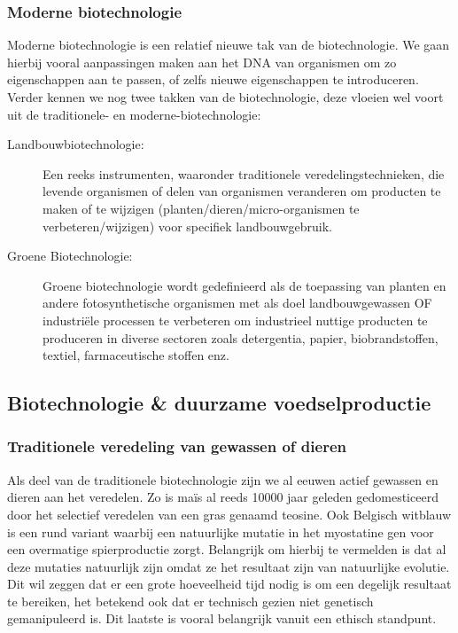 \documentclass[a4paper,kul]{kulakarticle} %
\begin{document}
\subsubsection{Moderne biotechnologie}
Moderne biotechnologie is een relatief nieuwe tak van de biotechnologie. We gaan hierbij vooral aanpassingen maken aan het DNA van organismen om zo eigenschappen aan te passen, of zelfs nieuwe eigenschappen te introduceren. 
\newpage
Verder kennen we nog twee takken van de biotechnologie, deze vloeien wel voort uit de traditionele- en moderne-biotechnologie:
\begin{description}
	\item[Landbouwbiotechnologie:] Een reeks instrumenten, waaronder traditionele veredelingstechnieken,
	die levende organismen of delen van organismen veranderen om
	producten te maken of te wijzigen (planten/dieren/micro-organismen te
	verbeteren/wijzigen) voor specifiek landbouwgebruik.
	\item[Groene Biotechnologie:] Groene biotechnologie wordt gedefinieerd als de
	toepassing van planten en andere fotosynthetische
	organismen met als doel landbouwgewassen OF
	industriële processen te verbeteren om industrieel nuttige producten te
	produceren in diverse sectoren zoals detergentia, papier,
	biobrandstoffen, textiel, farmaceutische stoffen enz.
\end{description}
\subsection{Biotechnologie \& duurzame voedselproductie}
\subsubsection{Traditionele veredeling van gewassen of dieren}
Als deel van de traditionele biotechnologie zijn we al eeuwen actief gewassen en dieren aan het veredelen. Zo is maïs al reeds \num{10000} jaar geleden gedomesticeerd door het selectief veredelen van een gras genaamd teosine. Ook Belgisch witblauw is een rund variant waarbij een natuurlijke mutatie in het myostatine gen voor een overmatige spierproductie zorgt. Belangrijk om hierbij te vermelden is dat al deze mutaties natuurlijk zijn omdat ze het resultaat zijn van natuurlijke evolutie. Dit wil zeggen dat er een grote hoeveelheid tijd nodig is om een degelijk resultaat te bereiken, het betekend ook dat er technisch gezien niet genetisch gemanipuleerd is. Dit laatste is vooral belangrijk vanuit een ethisch standpunt. 
\end{document}
